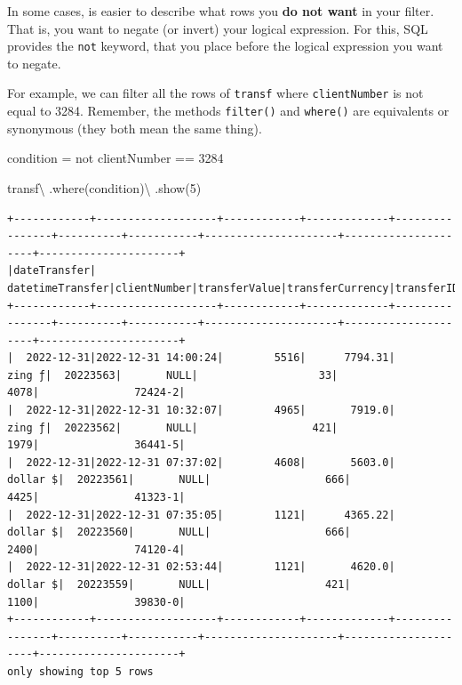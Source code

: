 \documentclass[
  11pt,
  letterpaper,
  DIV=11,
  numbers=noendperiod]{scrreprt}
\newenvironment{Shaded}{\begin{snugshade}}{\end{snugshade}}
\newcommand{\DecValTok}[1]{\textcolor[rgb]{0.68,0.00,0.00}{#1}}
\newcommand{\NormalTok}[1]{\textcolor[rgb]{0.00,0.23,0.31}{#1}}
\newcommand{\OperatorTok}[1]{\textcolor[rgb]{0.37,0.37,0.37}{#1}}
\newcommand{\StringTok}[1]{\textcolor[rgb]{0.13,0.47,0.30}{#1}}
\begin{document}
In some cases, is easier to describe what rows you \textbf{do not want}
in your filter. That is, you want to negate (or invert) your logical
expression. For this, SQL provides the \texttt{not} keyword, that you
place before the logical expression you want to negate.

For example, we can filter all the rows of \texttt{transf} where
\texttt{clientNumber} is not equal to 3284. Remember, the methods
\texttt{filter()} and \texttt{where()} are equivalents or synonymous
(they both mean the same thing).

\begin{Shaded}
\begin{Highlighting}[]
\NormalTok{condition }\OperatorTok{=} \StringTok{\textquotesingle{}\textquotesingle{}\textquotesingle{}}
\StringTok{  not clientNumber == 3284}
\StringTok{\textquotesingle{}\textquotesingle{}\textquotesingle{}}

\NormalTok{transf}\OperatorTok{\textbackslash{}}
\NormalTok{  .where(condition)}\OperatorTok{\textbackslash{}}
\NormalTok{  .show(}\DecValTok{5}\NormalTok{)}
\end{Highlighting}
\end{Shaded}

\begin{verbatim}
+------------+-------------------+------------+-------------+----------------+----------+-----------+---------------------+---------------------+----------------------+
|dateTransfer|   datetimeTransfer|clientNumber|transferValue|transferCurrency|transferID|transferLog|destinationBankNumber|destinationBankBranch|destinationBankAccount|
+------------+-------------------+------------+-------------+----------------+----------+-----------+---------------------+---------------------+----------------------+
|  2022-12-31|2022-12-31 14:00:24|        5516|      7794.31|          zing ƒ|  20223563|       NULL|                   33|                 4078|               72424-2|
|  2022-12-31|2022-12-31 10:32:07|        4965|       7919.0|          zing ƒ|  20223562|       NULL|                  421|                 1979|               36441-5|
|  2022-12-31|2022-12-31 07:37:02|        4608|       5603.0|        dollar $|  20223561|       NULL|                  666|                 4425|               41323-1|
|  2022-12-31|2022-12-31 07:35:05|        1121|      4365.22|        dollar $|  20223560|       NULL|                  666|                 2400|               74120-4|
|  2022-12-31|2022-12-31 02:53:44|        1121|       4620.0|        dollar $|  20223559|       NULL|                  421|                 1100|               39830-0|
+------------+-------------------+------------+-------------+----------------+----------+-----------+---------------------+---------------------+----------------------+
only showing top 5 rows
\end{verbatim}
\end{document}
